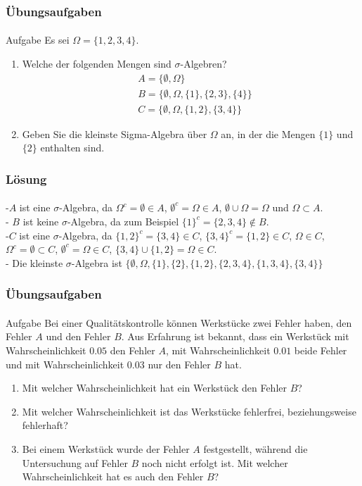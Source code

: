 \documentclass{beamer}
\begin{document}
\begin{frame}
    \frametitle{Übungsaufgaben}
\framesubtitle{}
\begin{block}{Aufgabe}
Es sei $\Omega = \{ 1,2,3,4\}$. 
\begin{enumerate}
\item Welche der folgenden Mengen sind $\sigma$-Algebren?
\begin{align*}
& A =  \{ \emptyset,  \Omega  \} \\
& B=  \{ \emptyset,  \Omega , \{ 1\}, \{ 2,3\}, \{ 4\} \}  \\
& C=  \{ \emptyset,  \Omega ,  \{ 1,2\}, \{ 3, 4\} \}  
\end{align*}
\item Geben Sie die kleinste Sigma-Algebra über $\Omega$ an, in der die Mengen $ \{ 1\}$ und $ \{ 2\}$ enthalten sind.
\end{enumerate}
\end{block}

 \end{frame}


\begin{frame}
    \frametitle{Lösung}
\framesubtitle{}
-$A$ ist eine $\sigma$-Algebra, da $ \Omega^c =  \emptyset \in A$, $\emptyset^c = \Omega \in A$, $\emptyset \cup \Omega = \Omega$ und $\Omega \subset A$.
\\- $B$ ist keine $\sigma$-Algebra, da zum Beispiel $\{ 1 \}^c = \{ 2,3,4 \} \notin B$.
\\-$C$ ist eine   $\sigma$-Algebra, da $\{ 1,2 \}^c = \{ 3,4 \} \in C$, $\{ 3,4 \}^c = \{ 1,2 \} \in C$,  $\Omega \in C$,$ \Omega^c =  \emptyset \subset C$, $\emptyset^c = \Omega \in C$, $\{ 3,4 \} \cup\{ 1,2 \} = \Omega \in C$.
\\- Die kleinste $\sigma$-Algebra ist $  \{ \emptyset,  \Omega , \{ 1\}, \{ 2\}, \{ 1, 2\},  \{ 2,3,4\}, \{1, 3, 4\}, \{ 3,4\} \} $
\end{frame}



\begin{frame}
    \frametitle{Übungsaufgaben}
\framesubtitle{}
\begin{block}{Aufgabe}
Bei einer Qualitätskontrolle können Werkstücke zwei Fehler haben, den Fehler $A$ und den Fehler $B$. Aus Erfahrung ist bekannt, dass ein Werkstück mit Wahrscheinlichkeit $0.05$  den Fehler $A$, mit Wahrscheinlichkeit $0.01$ beide Fehler und mit  Wahrscheinlichkeit $0.03$ nur den Fehler $B$ hat.
\begin{enumerate}
\item Mit welcher Wahrscheinlichkeit hat ein Werkstück den Fehler $B$?
\item Mit welcher Wahrscheinlichkeit ist das Werkstücke fehlerfrei, beziehungsweise fehlerhaft?
\item Bei einem Werkstück wurde der Fehler $A$ festgestellt, während die Untersuchung auf Fehler $B$ noch nicht erfolgt ist. Mit welcher Wahrscheinlichkeit hat es auch den Fehler $B$?
\end{enumerate}
\end{block}
 \end{frame}
\end{document}
